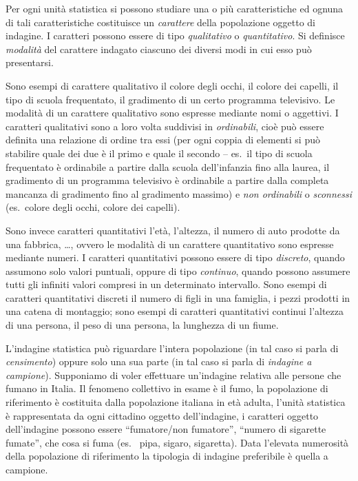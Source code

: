 \begin{definizione}
Per ogni unità statistica si possono studiare una o più caratteristiche ed ognuna di tali caratteristiche costituisce un \emph{carattere} della popolazione oggetto
di indagine. I caratteri possono essere di tipo \emph{qualitativo} o \emph{quantitativo}.
Si definisce \emph{modalità} del carattere indagato ciascuno dei diversi modi in cui esso può presentarsi.
\end{definizione}

Sono esempi di carattere qualitativo il colore degli occhi, il colore dei capelli, il tipo di scuola frequentato, il gradimento di un certo programma televisivo.
Le modalità di un carattere qualitativo sono espresse mediante nomi o aggettivi.
I caratteri qualitativi sono a loro volta suddivisi in \emph{ordinabili}, cioè può essere definita una relazione di ordine tra essi (per ogni coppia di elementi si può stabilire quale dei due è il primo e quale il secondo -- es.~il tipo di scuola frequentato è ordinabile a partire dalla scuola dell'infanzia fino alla laurea,
il gradimento di un programma televisivo è ordinabile a partire dalla completa mancanza di gradimento fino al gradimento massimo) e \emph{non ordinabili} o \emph{sconnessi}
(es.~colore degli occhi, colore dei capelli).

Sono invece caratteri quantitativi l'età, l'altezza, il numero di auto prodotte da una fabbrica, \ldots, ovvero le modalità di un carattere quantitativo sono espresse mediante numeri.
I caratteri quantitativi possono essere di tipo \emph{discreto}, quando assumono solo valori puntuali, oppure di tipo \emph{continuo}, quando possono assumere
tutti gli infiniti valori compresi in un determinato intervallo. Sono esempi di caratteri quantitativi discreti il numero di figli in una famiglia,
i pezzi prodotti in una catena di montaggio; sono esempi di caratteri quantitativi continui l'altezza di una persona, il peso di una persona, la lunghezza di un fiume.

L'indagine statistica può riguardare l'intera popolazione (in tal caso si parla di \emph{censimento}) oppure solo una sua parte (in tal caso si parla di \emph{indagine a campione}).
Supponiamo di voler effettuare un'indagine relativa alle persone che fumano in Italia. Il fenomeno collettivo in esame è il fumo, la popolazione di riferimento
è costituita dalla popolazione italiana in età adulta, l'unità statistica è rappresentata da ogni cittadino oggetto dell'indagine, i caratteri oggetto
dell'indagine possono essere ``fumatore/{}non fumatore'', ``numero di sigarette fumate'', che cosa si fuma (es.~ pipa, sigaro, sigaretta). Data l'elevata numerosità
della popolazione di riferimento la tipologia di indagine preferibile è quella a campione.

